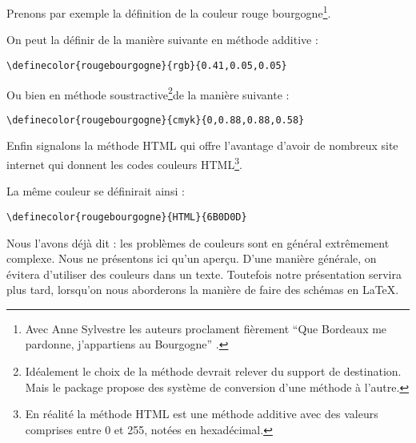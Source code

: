 Prenons par exemple la définition de la couleur \textcolor{rougebourgogne}{rouge bourgogne}\footnote{Avec Anne Sylvestre les auteurs proclament fièrement \enquote{Que Bordeaux me pardonne, j’appartiens au Bourgogne} \parencite{romaneconti}.}.

On peut la définir de la manière suivante en méthode additive :
\begin{verbatim}
\definecolor{rougebourgogne}{rgb}{0.41,0.05,0.05}
\end{verbatim}

Ou bien en méthode soustractive\footnote{Idéalement le choix de  la méthode devrait relever du support de destination. Mais le package  propose des système de conversion d'une méthode à l'autre.}de la manière suivante :
\begin{verbatim}
\definecolor{rougebourgogne}{cmyk}{0,0.88,0.88,0.58}
\end{verbatim}

Enfin signalons la méthode HTML qui offre l'avantage d'avoir de nombreux site internet qui donnent les codes couleurs HTML\footnote{En réalité la méthode HTML est une méthode additive avec des valeurs comprises entre 0 et 255, notées en hexadécimal.}.

La même couleur se définirait ainsi :

\begin{verbatim}
\definecolor{rougebourgogne}{HTML}{6B0D0D}
\end{verbatim}



\begin{attention}
	Nous l'avons déjà dit : les problèmes de couleurs sont en général extrêmement complexe. Nous ne présentons ici qu'un aperçu. D'une manière générale, on évitera d'utiliser des couleurs dans un texte. Toutefois notre présentation servira plus tard, lorsqu'on nous aborderons la manière de faire des schémas en LaTeX.
	
\end{attention}



